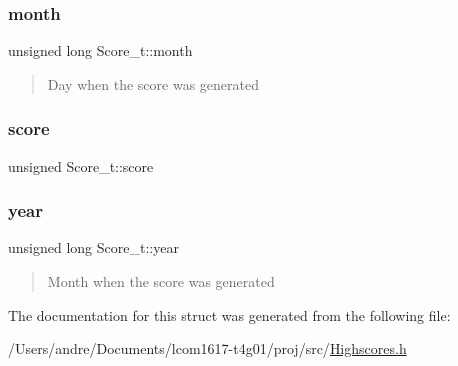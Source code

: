 \hypertarget{struct_score__t_a16e3369fa57b8148abfb58748004cf36}{}\label{struct_score__t_a16e3369fa57b8148abfb58748004cf36} 
\subsubsection{\texorpdfstring{month}{month}}
{\footnotesize\ttfamily unsigned long Score\+\_\+t\+::month}



\begin{quote}
Day when the score was generated \end{quote}


\hypertarget{struct_score__t_ad6b186bd04c2536263e3ed3127de805c}{}\label{struct_score__t_ad6b186bd04c2536263e3ed3127de805c} 
\subsubsection{\texorpdfstring{score}{score}}
{\footnotesize\ttfamily unsigned Score\+\_\+t\+::score}

\hypertarget{struct_score__t_a5cbdf9b5075e8f5f8f5fd2032bc459cc}{}\label{struct_score__t_a5cbdf9b5075e8f5f8f5fd2032bc459cc} 
\subsubsection{\texorpdfstring{year}{year}}
{\footnotesize\ttfamily unsigned long Score\+\_\+t\+::year}



\begin{quote}
Month when the score was generated \end{quote}




The documentation for this struct was generated from the following file\+:\begin{DoxyCompactItemize}
\item 
/\+Users/andre/\+Documents/lcom1617-\/t4g01/proj/src/\hyperlink{_highscores_8h}{Highscores.\+h}\end{DoxyCompactItemize}
